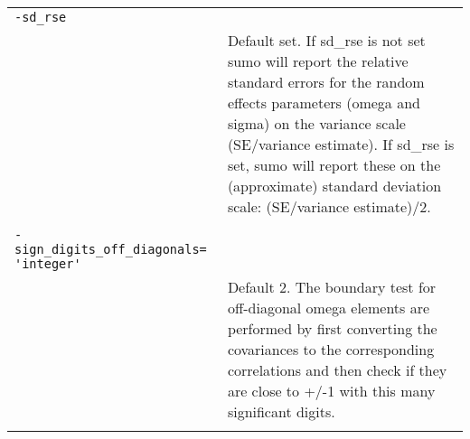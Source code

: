 \documentclass[a4paper,12pt]{article}
\begin{document}
\begin{longtable}{p{1in}p{4in}}
\\
\verb|-sd_rse| & \\
\nopagebreak
 & Default set. If sd\_rse is not set sumo will report the relative standard errors for the random effects parameters (omega and sigma) on the variance scale (SE/variance estimate). If sd\_rse is set, sumo will report these on the (approximate) standard deviation scale: (SE/variance estimate)/2. \\
\\
\verb|-sign_digits_off_diagonals= 'integer'| & \\
\nopagebreak
 & Default 2. The boundary test for off-diagonal omega elements are performed by first converting the covariances to the corresponding correlations and then check if they are close to +/-1 with this many significant digits.  \\
\\
\end{longtable}
\end{document}
